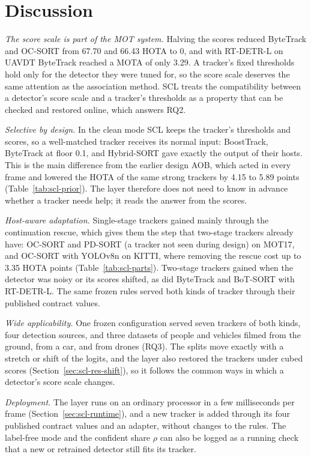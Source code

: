 \section{Discussion}\label{sec:scl-discussion}
\emph{The score scale is part of the MOT system.} Halving the scores reduced ByteTrack and OC-SORT from 67.70 and 66.43 HOTA to 0, and with RT-DETR-L on UAVDT ByteTrack reached a MOTA of only 3.29. A tracker's fixed thresholds hold only for the detector they were tuned for, so the score scale deserves the same attention as the association method. SCL treats the compatibility between a detector's score scale and a tracker's thresholds as a property that can be checked and restored online, which answers RQ2.

\emph{Selective by design.} In the clean mode SCL keeps the tracker's thresholds and scores, so a well-matched tracker receives its normal input: BoostTrack, ByteTrack at floor 0.1, and Hybrid-SORT gave exactly the output of their hosts. This is the main difference from the earlier design AOB, which acted in every frame and lowered the HOTA of the same strong trackers by 4.15 to 5.89 points (Table~\ref{tab:scl-prior}). The layer therefore does not need to know in advance whether a tracker needs help; it reads the answer from the scores.

\emph{Host-aware adaptation.} Single-stage trackers gained mainly through the continuation rescue, which gives them the step that two-stage trackers already have: OC-SORT and PD-SORT (a tracker not seen during design) on MOT17, and OC-SORT with YOLOv8n on KITTI, where removing the rescue cost up to 3.35 HOTA points (Table~\ref{tab:scl-parts}). Two-stage trackers gained when the detector was noisy or its scores shifted, as did ByteTrack and BoT-SORT with RT-DETR-L. The same frozen rules served both kinds of tracker through their published contract values.

\emph{Wide applicability.} One frozen configuration served seven trackers of both kinds, four detection sources, and three datasets of people and vehicles filmed from the ground, from a car, and from drones (RQ3). The splits move exactly with a stretch or shift of the logits, and the layer also restored the trackers under cubed scores (Section~\ref{sec:scl-res-shift}), so it follows the common ways in which a detector's score scale changes.

\emph{Deployment.} The layer runs on an ordinary processor in a few milliseconds per frame (Section~\ref{sec:scl-runtime}), and a new tracker is added through its four published contract values and an adapter, without changes to the rules. The label-free mode and the confident share $\rho$ can also be logged as a running check that a new or retrained detector still fits its tracker.

